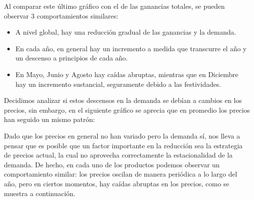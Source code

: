 \documentclass[12pt,a4paper]{article}
\begin{document}
Al comparar este último gráfico con el de las ganancias totales, se pueden observar 3 comportamientos similares: 
\begin{itemize}
    \item A nivel global, hay una reducción gradual de las ganancias y la demanda.
    \item En cada año, en general hay un incremento a medida que transcurre el año y un descenso a principios de cada año.
    \item En Mayo, Junio y Agosto hay caídas abruptas, mientras que en Diciembre hay un incremento sustancial, seguramente debido a las festividades.
\end{itemize}

Decidimos analizar si estos descensos en la demanda se debían a cambios en los precios, sin embargo, en el siguiente gráfico se aprecia 
que en promedio los precios han seguido un mismo patrón:

\begin{center}
\end{center}

Dado que los precios en general no han variado pero la demanda sí, nos lleva a pensar que es posible que un factor 
importante en la reducción sea la estrategia de precios actual, la cual no aprovecha correctamente 
la estacionalidad de la demanda. De hecho, en cada uno de los productos podemos 
observar un comportamiento similar: los precios oscilan de manera periódica a lo largo del año, pero en ciertos 
momentos, hay caídas abruptas en los precios, como se muestra a continuación.

\begin{center}
\end{center}
\end{document}
